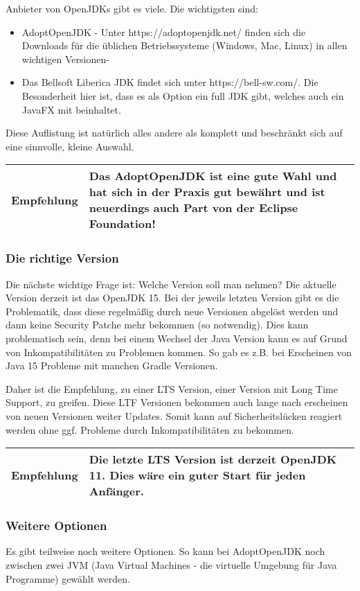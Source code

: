 Anbieter von OpenJDKs gibt es viele. Die wichtigsten sind:
\begin{itemize}
\item AdoptOpenJDK - Unter https://adoptopenjdk.net/ finden sich die Downloads für die üblichen Betriebssysteme (Windows, Mac, Linux) in allen wichtigen Versionen-
\item Das Bellsoft Liberica JDK findet sich unter https://bell-sw.com/. Die Besonderheit hier ist, dass es als Option ein full JDK gibt, welches auch ein JavaFX mit beinhaltet.
\end{itemize}
Diese Auflistung ist natürlich alles andere als komplett und beschränkt sich auf eine sinnvolle, kleine Auswahl.

\begin{tabular}[h]{|p{2cm}|p{9cm}|}
\hline
\textbf{Empfehlung} & Das AdoptOpenJDK ist eine gute Wahl und hat sich in der Praxis gut bewährt und ist neuerdings auch Part von der Eclipse Foundation! \\
\hline
\end{tabular}

\subsubsection{Die richtige Version}
Die nächste wichtige Frage ist: Welche Version soll man nehmen? Die aktuelle Version derzeit ist das OpenJDK 15. Bei der jeweils letzten Version gibt es die Problematik, dass diese regelmäßig durch neue Versionen abgelöst werden und dann keine Security Patche mehr bekommen (so notwendig). Dies kann problematisch sein, denn bei einem Wechsel der Java Version kann es auf Grund von Inkompatibilitäten zu Problemen kommen. So gab es z.B. bei Erscheinen von Java 15 Probleme mit manchen Gradle Versionen.

Daher ist die Empfehlung, zu einer LTS Version, einer Version mit Long Time Support, zu greifen. Diese LTF Versionen bekommen auch lange nach erscheinen von neuen Versionen weiter Updates. Somit kann auf Sicherheitslücken reagiert werden ohne ggf. Probleme durch Inkompatibilitäten zu bekommen.

\begin{tabular}[h]{|p{2cm}|p{9cm}|}
\hline
\textbf{Empfehlung} & Die letzte LTS Version ist derzeit OpenJDK 11. Dies wäre ein guter Start für jeden Anfänger. \\
\hline
\end{tabular}

\subsubsection{Weitere Optionen}
Es gibt teilweise noch weitere Optionen. So kann bei AdoptOpenJDK noch zwischen zwei JVM (Java Virtual Machines - die virtuelle Umgebung für Java Programme) gewählt werden.

